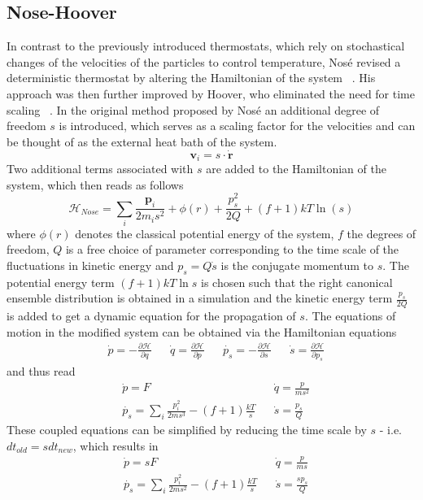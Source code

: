 \subsection{Nose-Hoover}
In contrast to the previously introduced thermostats, which rely on stochastical changes of the velocities of the particles to control temperature, Nosé revised a deterministic thermostat by altering the Hamiltonian of the system ~\cite{Nose2002}. His approach was then further improved by Hoover, who eliminated the need for time scaling ~\cite{Hoover1985}. 
In the original method proposed by Nosé an additional degree of freedom $s$ is introduced, which serves as a scaling factor for the velocities and can be thought of as the external heat bath of the system.
\begin{equation}
\mathbf{v}_i = s\cdot \dot{\mathbf{r}}
\end{equation}  
Two additional terms associated with $s$ are added to the Hamiltonian of the system, which then reads as follows
\begin{equation}
\mathcal{H}_{Nose} = \sum_i \frac{\mathbf{p}_i}{2m_i s^2} + \phi (r) + \frac{p_s^2}{2Q} + (f+1)kT\ln(s) 
\end{equation} 
where $\phi(r)$ denotes the classical potential energy of the system, $f$ the degrees of freedom, $Q$ is a free choice of parameter corresponding to the time scale of the fluctuations in kinetic energy and $p_s = Q\dot{s}$ is the conjugate momentum to $s$. The potential energy term $(f+1)kT\ln{s}$ is chosen such that the right canonical ensemble distribution is obtained in a simulation and the kinetic energy term $\frac{p_s}{2Q}$ is added to get a dynamic equation for the propagation of $s$.   
The equations of motion in the modified system can be obtained via the Hamiltonian equations
\begin{align*}
        & \dot{p} = - \frac{\partial \mathcal{H}}{\partial q} &&  \dot{q} = \frac{\partial \mathcal{H}}{\partial p}
        && \dot{p_s} = - \frac{\partial \mathcal{H}}{\partial s} && \dot{s} = \frac{\partial \mathcal{H}}{\partial p_s}
\end{align*}
and thus read 
\begin{align*}
& \dot{p} = F && \dot{q} = \frac{p}{m s^2} \\
& \dot{p_s} = \sum_i \frac{p_i^2}{2 m s^3} - (f+1)\frac{kT}{s} &&  \dot{s} = \frac{p_s}{Q}
\end{align*}
These coupled equations can be simplified by reducing the time scale by $s$ - i.e. $dt_{old} = s dt_{new} $, which results in
\begin{align*}
& \dot{p} = s F && \dot{q} = \frac{p}{m s} \\
& \dot{p_s} = \sum_i \frac{p_i^2}{2 m s^2} - (f+1)\frac{kT}{s} &&  \dot{s} = \frac{s p_s}{Q}
\end{align*}
